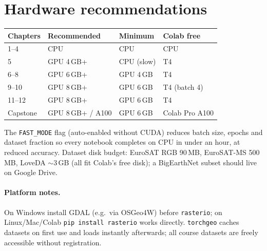 \section{Hardware recommendations}

\begin{center}\small
\renewcommand{\arraystretch}{1.15}
\begin{tabular}{@{}llll@{}}
\toprule
Chapters & Recommended & Minimum & Colab free\\
\midrule
1--4 & CPU & CPU & CPU\\
5 & GPU 4\,GB+ & CPU (slow) & T4\\
6--8 & GPU 6\,GB+ & GPU 4\,GB & T4\\
9--10 & GPU 8\,GB+ & GPU 6\,GB & T4 (batch 4)\\
11--12 & GPU 8\,GB+ & GPU 6\,GB & T4\\
Capstone & GPU 8\,GB+ / A100 & GPU 6\,GB & Colab Pro A100\\
\bottomrule
\end{tabular}
\end{center}

\noindent The \texttt{FAST\_MODE} flag (auto-enabled without CUDA) reduces batch
size, epochs and dataset fraction so every notebook completes on CPU in under an
hour, at reduced accuracy. Dataset disk budget: EuroSAT RGB 90\,MB, EuroSAT-MS
500\,MB, LoveDA $\sim$3\,GB (all fit Colab's free disk); a BigEarthNet subset
should live on Google Drive.

\paragraph{Platform notes.} On Windows install GDAL (e.g.\ via OSGeo4W) before
\texttt{rasterio}; on Linux/Mac/Colab \texttt{pip install rasterio} works
directly. \texttt{torchgeo} caches datasets on first use and loads instantly
afterwards; all course datasets are freely accessible without registration.
